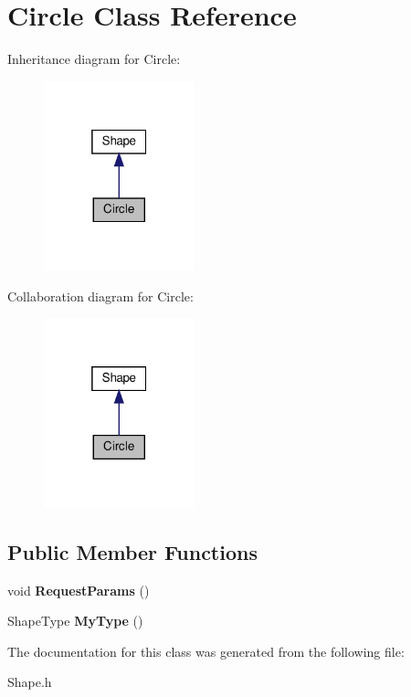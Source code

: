 \hypertarget{classCircle}{}\section{Circle Class Reference}
\label{classCircle}


Inheritance diagram for Circle\+:
\nopagebreak
\begin{figure}[H]
\begin{center}
\leavevmode
\includegraphics[width=124pt]{classCircle__inherit__graph}
\end{center}
\end{figure}


Collaboration diagram for Circle\+:
\nopagebreak
\begin{figure}[H]
\begin{center}
\leavevmode
\includegraphics[width=124pt]{classCircle__coll__graph}
\end{center}
\end{figure}
\subsection*{Public Member Functions}
\begin{DoxyCompactItemize}
\item 
\mbox{\label{classCircle_a694e0245495333f2e22c78a6ec4431e2}} 
void {\bfseries Request\+Params} ()
\item 
\mbox{\label{classCircle_a69f872d104bce615dd56eb2b5c87d224}} 
Shape\+Type {\bfseries My\+Type} ()
\end{DoxyCompactItemize}


The documentation for this class was generated from the following file\+:\begin{DoxyCompactItemize}
\item 
Shape.\+h\end{DoxyCompactItemize}
